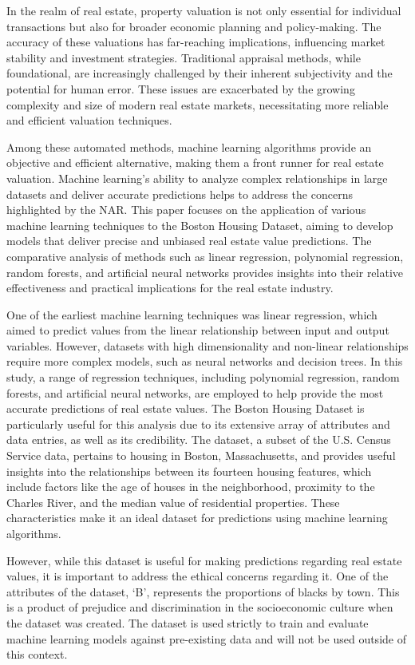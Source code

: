 \documentclass[conference, 11pt]{IEEEtran}
\begin{document}
In the realm of real estate, property valuation is not only essential for individual transactions but also for broader economic planning and policy-making. The accuracy of these valuations has far-reaching implications, influencing market stability and investment strategies. Traditional appraisal methods, while foundational, are increasingly challenged by their inherent subjectivity and the potential for human error. These issues are exacerbated by the growing complexity and size of modern real estate markets, necessitating more reliable and efficient valuation techniques.

Among these automated methods, machine learning algorithms provide an objective and efficient alternative, making them a front runner for real estate valuation. Machine learning's ability to analyze complex relationships in large datasets and deliver accurate predictions helps to address the concerns highlighted by the NAR. This paper focuses on the application of various machine learning techniques to the Boston Housing Dataset, aiming to develop models that deliver precise and unbiased real estate value predictions. The comparative analysis of methods such as linear regression, polynomial regression, random forests, and artificial neural networks provides insights into their relative effectiveness and practical implications for the real estate industry.

One of the earliest machine learning techniques was linear regression, which aimed to predict values from the linear relationship between input and output variables. However, datasets with high dimensionality and non-linear relationships require more complex models, such as neural networks and decision trees. In this study, a range of regression techniques, including polynomial regression, random forests, and artificial neural networks, are employed to help provide the most accurate predictions of real estate values.
The Boston Housing Dataset is particularly useful for this analysis due to its extensive array of attributes and data entries, as well as its credibility. The dataset, a subset of the U.S. Census Service data, pertains to housing in Boston, Massachusetts, and provides useful insights into the relationships between its fourteen housing features, which include factors like the age of houses in the neighborhood, proximity to the Charles River, and the median value of residential properties. These characteristics make it an ideal dataset for predictions using machine learning algorithms.

However, while this dataset is useful for making predictions regarding real estate values, it is important to address the ethical concerns regarding it. One of the attributes of the dataset, ‘B’, represents the proportions of blacks by town. This is a product of prejudice and discrimination in the socioeconomic culture when the dataset was created. The dataset is used strictly to train and evaluate machine learning models against pre-existing data and will not be used outside of this context.
\end{document}
